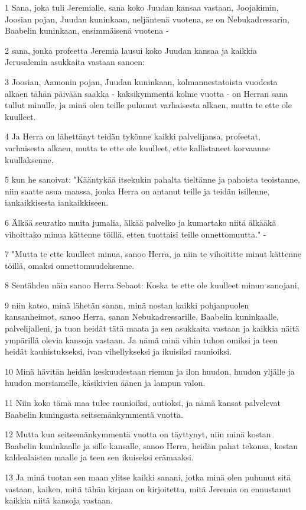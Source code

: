 \par 1 Sana, joka tuli Jeremialle, sana koko Juudan kansaa vastaan, Joojakimin, Joosian pojan, Juudan kuninkaan, neljäntenä vuotena, se on Nebukadressarin, Baabelin kuninkaan, ensimmäisenä vuotena -
\par 2 sana, jonka profeetta Jeremia lausui koko Juudan kansaa ja kaikkia Jerusalemin asukkaita vastaan sanoen:
\par 3 Joosian, Aamonin pojan, Juudan kuninkaan, kolmannestatoista vuodesta alkaen tähän päivään saakka - kaksikymmentä kolme vuotta - on Herran sana tullut minulle, ja minä olen teille puhunut varhaisesta alkaen, mutta te ette ole kuulleet.
\par 4 Ja Herra on lähettänyt teidän tykönne kaikki palvelijansa, profeetat, varhaisesta alkaen, mutta te ette ole kuulleet, ette kallistaneet korvaanne kuullaksenne,
\par 5 kun he sanoivat: "Kääntykää itsekukin pahalta tieltänne ja pahoista teoistanne, niin saatte asua maassa, jonka Herra on antanut teille ja teidän isillenne, iankaikkisesta iankaikkiseen.
\par 6 Älkää seuratko muita jumalia, älkää palvelko ja kumartako niitä älkääkä vihoittako minua kättenne töillä, etten tuottaisi teille onnettomuutta." -
\par 7 "Mutta te ette kuulleet minua, sanoo Herra, ja niin te vihoititte minut kättenne töillä, omaksi onnettomuudeksenne.
\par 8 Sentähden näin sanoo Herra Sebaot: Koska te ette ole kuulleet minun sanojani,
\par 9 niin katso, minä lähetän sanan, minä nostan kaikki pohjanpuolen kansanheimot, sanoo Herra, sanan Nebukadressarille, Baabelin kuninkaalle, palvelijalleni, ja tuon heidät tätä maata ja sen asukkaita vastaan ja kaikkia näitä ympärillä olevia kansoja vastaan. Ja nämä minä vihin tuhon omiksi ja teen heidät kauhistukseksi, ivan vihellykseksi ja ikuisiksi raunioiksi.
\par 10 Minä hävitän heidän keskuudestaan riemun ja ilon huudon, huudon yljälle ja huudon morsiamelle, käsikivien äänen ja lampun valon.
\par 11 Niin koko tämä maa tulee raunioiksi, autioksi, ja nämä kansat palvelevat Baabelin kuningasta seitsemänkymmentä vuotta.
\par 12 Mutta kun seitsemänkymmentä vuotta on täyttynyt, niin minä kostan Baabelin kuninkaalle ja sille kansalle, sanoo Herra, heidän pahat tekonsa, kostan kaldealaisten maalle ja teen sen ikuiseksi erämaaksi.
\par 13 Ja minä tuotan sen maan ylitse kaikki sanani, jotka minä olen puhunut sitä vastaan, kaiken, mitä tähän kirjaan on kirjoitettu, mitä Jeremia on ennustanut kaikkia niitä kansoja vastaan.
